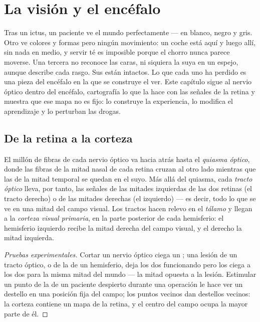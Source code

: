 \chapter{La visión y el encéfalo}\label{ch:g11:vision-and-brain}

Tras un ictus, un paciente ve el mundo perfectamente --- en blanco,
negro y gris. Otro ve colores y formas pero ningún movimiento: un coche
está aquí y luego allí, sin nada en medio, y servir té es imposible
porque el chorro nunca parece moverse. Una tercera no reconoce las
caras, ni siquiera la suya en un espejo, aunque describe cada rasgo.
Sus  están intactos. Lo que cada uno ha perdido es una pieza del
encéfalo en la que se construye el ver. Este capítulo sigue al nervio
óptico dentro del encéfalo, cartografía lo que la  hace
con las señales de la retina y muestra que ese mapa no es fijo: lo
construye la experiencia, lo modifica el aprendizaje y lo perturban las
drogas.

\section{De la retina a la corteza}

\begin{proposition}\label{prop:g11:vision-and-brain:pathway}
El millón de fibras de cada nervio óptico va hacia atrás hasta el
\emph{quiasma óptico}, donde las fibras de la mitad nasal de cada
retina cruzan al otro lado mientras que las de la mitad temporal se
quedan en el suyo. Más allá del quiasma, cada \emph{tracto óptico}
lleva, por tanto, las señales de las mitades izquierdas de las dos
retinas (el tracto derecho) o de las mitades derechas (el izquierdo)
--- es decir, todo lo que se ve en una mitad del campo visual. Los
tractos hacen relevo en el \emph{tálamo} y llegan a la \emph{corteza
visual primaria}, en la parte posterior de cada
hemisferio: el hemisferio izquierdo recibe la mitad derecha del campo
visual, y el derecho la mitad izquierda.
\end{proposition}
\begin{proof}[Pruebas experimentales]
Cortar un nervio óptico ciega un ; una lesión de un tracto óptico, o
de la  de un hemisferio, deja los dos  funcionando
pero los ciega a los dos para la misma mitad del mundo --- la mitad
opuesta a la lesión. Estimular un punto de la  de un
paciente despierto durante una operación le hace ver un destello en una
posición fija del campo; los puntos vecinos dan destellos vecinos: la
corteza contiene un mapa de la retina, y el centro del campo ocupa la
mayor parte de él.
\end{proof}

